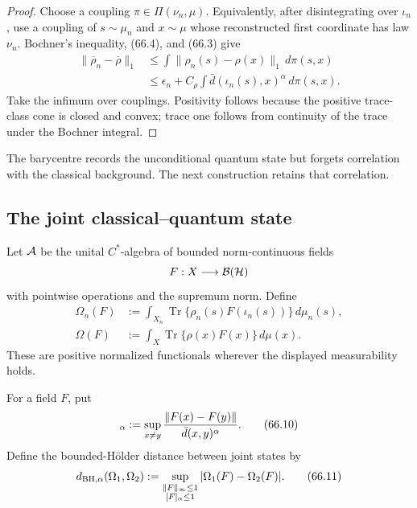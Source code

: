 \documentclass[11pt]{article}
\theoremstyle{remark}
\begin{document}
\begin{proof}
Choose a coupling \(\pi\in\Pi(\nu_n,\mu)\).  Equivalently, after
disintegrating over \(\iota_n\), use a coupling of \(s\sim\mu_n\)
and \(x\sim\mu\) whose reconstructed first coordinate has law
\(\nu_n\).  Bochner's inequality, (66.4), and (66.3) give
\begin{align}
 \|\overline\rho_n-\overline\rho\|_1
 &\leq
 \int\|\rho_n(s)-\rho(x)\|_1\,d\pi(s,x)           \nonumber\\
 &\leq
 \epsilon_n+
 C_\rho\int\bar d(\iota_n(s),x)^\alpha\,d\pi(s,x).
                                                        \tag{66.7}
\end{align}
Take the infimum over couplings.  Positivity follows because the
positive trace-class cone is closed and convex; trace one follows
from continuity of the trace under the Bochner integral.
\end{proof}

The barycentre records the unconditional quantum state but forgets
correlation with the classical background.  The next construction
retains that correlation.

\subsection{The joint classical--quantum state}

Let \({\cal A}\) be the unital \(C^*\)-algebra of bounded
norm-continuous fields
\[
 F:X\longrightarrow{\cal B}({\cal H})
\]
with pointwise operations and the supremum norm.  Define
\begin{align}
 \Omega_n(F)
 &:=
 \int_{X_n}
 \operatorname{Tr}\{\rho_n(s)F(\iota_n(s))\}
 \,d\mu_n(s),                                     \tag{66.8}\\
 \Omega(F)
 &:=
 \int_X\operatorname{Tr}\{\rho(x)F(x)\}\,d\mu(x). \tag{66.9}
\end{align}
These are positive normalized functionals wherever the displayed
measurability holds.

For a field \(F\), put
\begin{equation}
 [F]_\alpha
 :=
 \sup_{x\ne y}
 {\|F(x)-F(y)\|\over\bar d(x,y)^\alpha}.          \tag{66.10}
\end{equation}
Define the bounded-Hölder distance between joint states by
\begin{equation}
 d_{\rm BH,\alpha}(\Omega_1,\Omega_2)
 :=
 \sup_{\substack{\|F\|_\infty\leq1\\ {}[F]_\alpha\leq1}}
 |\Omega_1(F)-\Omega_2(F)|.                       \tag{66.11}
\end{equation}
\end{document}
